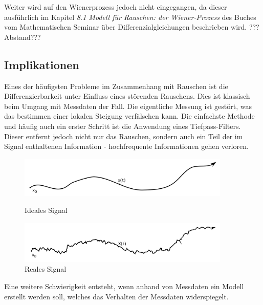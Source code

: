Weiter wird auf den Wienerprozess jedoch nicht eingegangen, da dieser ausführlich im Kapitel \glqq \textit{8.1 Modell für Rauschen: der Wiener-Prozess}\glqq{} des Buches vom Mathematischen Seminar über Differenzialgleichungen beschrieben wird. ???Abstand???


\subsection{Implikationen\label{brown:Rauschen:Implikationen}}

Eines der häufigsten Probleme im Zusammenhang mit Rauschen ist die Differenzierbarkeit unter Einfluss eines störenden Rauschens. Dies ist klassisch beim Umgang mit Messdaten der Fall. Die eigentliche Messung ist gestört, was das bestimmen einer lokalen Steigung verfälschen kann. Die einfachste Methode und häufig auch ein erster Schritt ist die Anwendung eines Tiefpass-Filters. Dieser entfernt jedoch nicht nur das Rauschen, sondern auch ein Teil der im Signal enthaltenen Information - hochfrequente Informationen gehen verloren.

\begin{figure}
	\centering
	\begin{minipage}{0.45\textwidth}
		\centering
		\includegraphics[width=0.9\textwidth]{papers/brown/images/idealSignal.png}
		\caption{Ideales Signal}
		\label{idealSignal}
	\end{minipage}
	\hspace{0.05\linewidth}
	\begin{minipage}{0.45\textwidth}
		\centering
		\includegraphics[width=0.9\textwidth]{papers/brown/images/realSignal.png}
		\caption{Reales Signal}
		\label{realSignal}
	\end{minipage}
\end{figure}

Eine weitere Schwierigkeit entsteht, wenn anhand von Messdaten ein Modell erstellt werden soll, welches das Verhalten der Messdaten widerspiegelt.

